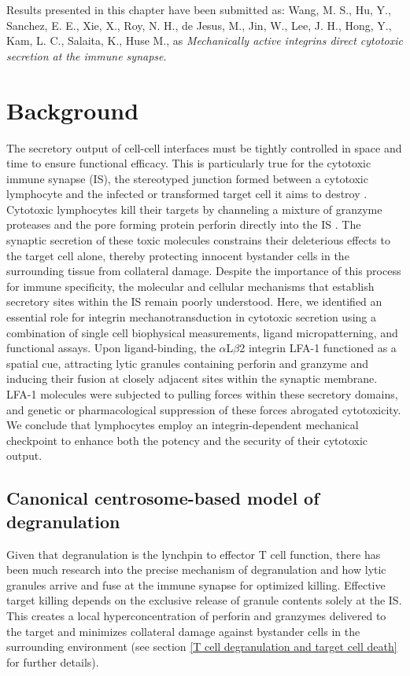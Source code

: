 Results presented in this chapter have been submitted as: Wang, M. S., Hu, Y., Sanchez, E. E.,  Xie, X., Roy, N. H., de Jesus, M., Jin, W., Lee, J. H., Hong, Y., Kam, L. C., Salaita, K., Huse M.,  as \textit{Mechanically active integrins direct cytotoxic secretion at the immune synapse}. 

\section{Background}
The secretory output of cell-cell interfaces must be tightly controlled in space and time to ensure functional efficacy. This is particularly true for the cytotoxic immune synapse (IS), the stereotyped junction formed between a cytotoxic lymphocyte and the infected or transformed target cell it aims to destroy \cite{Dustin2010}. Cytotoxic lymphocytes kill their targets by channeling a mixture of granzyme proteases and the pore forming protein perforin directly into the IS \cite{Stinchcombe2007, Chang2017}. The synaptic secretion of these toxic molecules constrains their deleterious effects to the target cell alone, thereby protecting innocent bystander cells in the surrounding tissue from collateral damage. Despite the importance of this process for immune specificity, the molecular and cellular mechanisms that establish secretory sites within the IS remain poorly understood. Here, we identified an essential role for integrin mechanotransduction in cytotoxic secretion using a combination of single cell biophysical measurements, ligand micropatterning, and functional assays. Upon ligand-binding, the $\alpha$L$\beta$2 integrin LFA-1 functioned as a spatial cue, attracting lytic granules containing perforin and granzyme and inducing their fusion at closely adjacent sites within the synaptic membrane. LFA-1 molecules were subjected to pulling forces within these secretory domains, and genetic or pharmacological suppression of these forces abrogated cytotoxicity. We conclude that lymphocytes employ an integrin-dependent mechanical checkpoint to enhance both the potency and the security of their cytotoxic output.

\subsection{Canonical centrosome-based model of degranulation}
Given that degranulation is the lynchpin to effector T cell function, there has been much research into the precise mechanism of degranulation and how lytic granules arrive and fuse at the immune synapse for optimized killing. Effective target killing depends on the exclusive release of granule contents solely at the IS. This creates a local hyperconcentration of perforin and granzymes delivered to the target and minimizes collateral damage against bystander cells in the surrounding environment (see section \ref{T cell degranulation and target cell death} for further details). 


